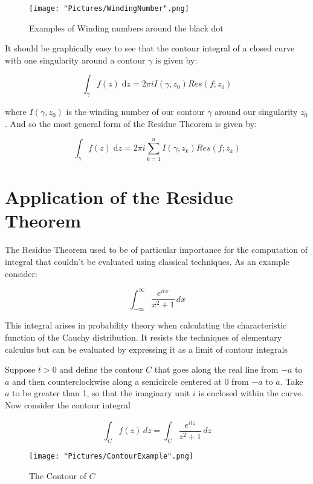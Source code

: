 \documentclass[12pt, letterpaper]{article}
\begin{document}
\begin{figure}[h]
    \centering
    \texttt{[image: "Pictures/WindingNumber".png]}
    \caption{Examples of Winding numbers around the black dot}
    \label{fig:my_label4}
\end{figure}

\noindent
It should be graphically easy to see that the contour integral of a closed curve with one singularity around a contour \(\gamma\) is given by:

\[\int_{\gamma}^{} f(z) \;\mathrm{d}z = 2\pi i I(\gamma, z_{0})Res(f;z_{0}) \]

\noindent
where \(I(\gamma,z_{0})\) is the winding number of our contour \(\gamma\) around our singularity \(z_{0}\). And so the most general form of the Residue Theorem is given by:

\[\int_{\gamma}^{} f(z) \;\mathrm{d}z = 2\pi i \sum_{k=1}^{n} I(\gamma,z_{k})Res(f;z_{k}) \]
\bigskip

\section*{Application of the Residue Theorem}

\noindent
The Residue Theorem used to be of particular importance for the computation of integral that couldn't be evaluated using classical techniques. As an example consider:

\[\int_{-\infty}^\infty \frac{e^{itx}}{x^2+1}\,dx \]

\noindent
This integral arises in probability theory when calculating the characteristic function of the Cauchy distribution. It resists the techniques of elementary calculus but can be evaluated by expressing it as a limit of contour integrals
\bigskip

\noindent
Suppose \(t > 0\) and define the contour \(C\) that goes along the real line from \( -a \) to \( a \) and then counterclockwise along a semicircle centered at 0 from \( -a \) to \( a \). Take \(a\) to be greater than 1, so that the imaginary unit \(i\) is enclosed within the curve.  Now consider the contour integral

\[ \int_C {f(z)}\,dz =\int_C \frac{e^{itz}}{z^2+1}\,dz \]

\begin{figure}[h]
    \centering
    \texttt{[image: "Pictures/ContourExample".png]}
    \caption{The Contour of \( C\)}
    \label{fig:my_label5}
\end{figure}
\end{document}
